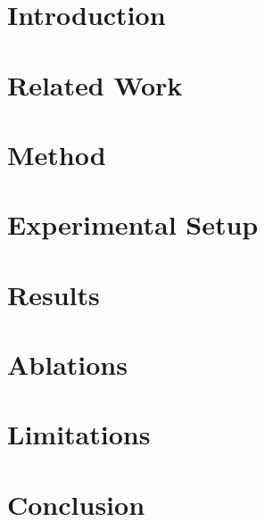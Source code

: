 \documentclass{article}
\begin{document}
\printAffiliationsAndNotice{}  %

\begin{abstract}
\end{abstract}

\section{Introduction}

\section{Related Work}

\section{Method}

\section{Experimental Setup}

\section{Results}

\section{Ablations}

\section{Limitations}

\section{Conclusion}



\end{document}
